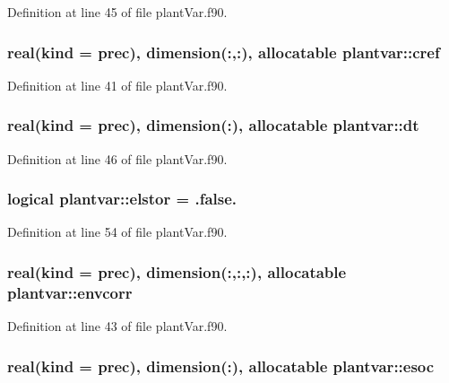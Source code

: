 Definition at line 45 of file plant\-Var.\-f90.

\hypertarget{classplantvar_a5ddb9d753dc518aed9d34c9e1f5335e0}{
\subsubsection[{cref}]{\setlength{\rightskip}{0pt plus 5cm}real(kind = prec), dimension(\-:,\-:), allocatable plantvar\-::cref}}\label{classplantvar_a5ddb9d753dc518aed9d34c9e1f5335e0}


Definition at line 41 of file plant\-Var.\-f90.

\hypertarget{classplantvar_ae10871bcf2f4379bd15a518a314038de}{
\subsubsection[{dt}]{\setlength{\rightskip}{0pt plus 5cm}real(kind = prec), dimension(\-:), allocatable plantvar\-::dt}}\label{classplantvar_ae10871bcf2f4379bd15a518a314038de}


Definition at line 46 of file plant\-Var.\-f90.

\hypertarget{classplantvar_a269d2dde89a5632bf0e3d0162c2368c0}{
\subsubsection[{elstor}]{\setlength{\rightskip}{0pt plus 5cm}logical plantvar\-::elstor = .false.}}\label{classplantvar_a269d2dde89a5632bf0e3d0162c2368c0}


Definition at line 54 of file plant\-Var.\-f90.

\hypertarget{classplantvar_a187eaf8e3b46428daf4b89db350aa0f1}{
\subsubsection[{envcorr}]{\setlength{\rightskip}{0pt plus 5cm}real(kind = prec), dimension(\-:,\-:,\-:), allocatable plantvar\-::envcorr}}\label{classplantvar_a187eaf8e3b46428daf4b89db350aa0f1}


Definition at line 43 of file plant\-Var.\-f90.

\hypertarget{classplantvar_a52a6a33ef0efbd1e6b19c59c683db54a}{
\subsubsection[{esoc}]{\setlength{\rightskip}{0pt plus 5cm}real(kind = prec), dimension(\-:), allocatable plantvar\-::esoc}}\label{classplantvar_a52a6a33ef0efbd1e6b19c59c683db54a}


